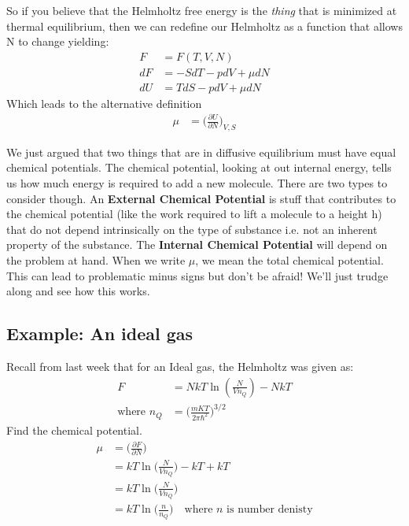 \documentclass[a4paper, 11pt]{article}
\begin{document}
	So if you believe that the Helmholtz free energy is the \textit{thing} that is minimized at thermal equilibrium, then we can redefine our Helmholtz as a function that allows N to change yielding: 
		\begin{align*}
			F &= F(T,V,N) \\ 
			dF &= -SdT -pdV + \mu dN \\ 
			dU &= TdS - pdV + \mu dN
		\end{align*}
	Which leads to the alternative definition
		\begin{align*}
			\mu &= \Big(\frac{\partial U}{\partial N}\Big)_{V,S}
		\end{align*}
	
	\noindent We just argued that two things that are in diffusive equilibrium must have equal chemical potentials. The chemical potential, looking at out internal energy, tells us how much energy is required to add a new molecule. There are two types to consider though. An \textbf{External Chemical Potential} is stuff that contributes to the chemical potential (like the work required to lift a molecule to a height h) that do not depend intrinsically on the type of substance i.e. not an inherent property of the substance. The \textbf{Internal Chemical Potential} will depend on the problem at hand. When we write $\mu$, we mean the total chemical potential. This can lead to problematic minus signs but don't be afraid! We'll just trudge along and see how this works. 
		
		
\subsection*{Example: An ideal gas} 
	Recall from last week that for an Ideal gas, the Helmholtz was given as:
		\begin{align*}
			F &= NkT\ln(\frac{N}{Vn_Q})-NkT \\ 
			\text{where } n_Q &= \Big(\frac{mKT}{2\pi \hbar^2}\Big)^{3/2}
		\end{align*}
	\noindent Find the chemical potential.
		\begin{align*}
			\mu &= \Big(\frac{\partial F}{\partial N}\Big) \\ 
				&= kT\ln\Big(\frac{N}{Vn_Q}\Big)-kT+kT \\ 
				&= kT\ln\Big(\frac{N}{Vn_Q}\Big) \\
				&= kT\ln\Big(\frac{n}{n_Q}\Big) \quad \text{where } n \text{ is number denisty} 
		\end{align*}
		
\end{document}

